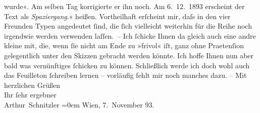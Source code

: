 \begin{ledgroupsized}[t]{13cm}
{{{                     wurde«. Am selben Tag korrigierte er ihn noch. Am
                     6. 12. 1893 erscheint der Text als \emph{Spaziergang}.}}}\label{K_L00280_1h}« heißen. Vortheilhaft erſcheint mir, daſs
               in den vier Freunden \label{LL001-2v}Typen\label{LL001-2h} angedeutet
               ſind, die ſich vielleicht {\pb}weiterhin für die Reihe
               noch irgendwie werden verwenden laſſen. –\pend
           \pstart
           Ich ſchicke Ihnen da gleich auch eine andre kleine \label{K_L00280_2v}\label{K_L00280_2h} mit, die, wenn ſie
               nicht am Ende zu »frivol« iſt, ganz ohne Praetenſion gelegentlich unter den Skizzen
               gebracht werden könnte.\pend
           \pstart
           Ich hoffe Ihnen nun aber bald was vernünftiges ſchicken {\pb}zu können. \label{LL001-1v}Schließlich werde ich doch wohl auch das Feuilleton
                  ſchreiben lernen – vorläufig fehlt mir noch manches dazu\label{LL001-1h}.\pend
           \pstart
           – Mit herzlichen Grüßen{\\[\baselineskip]}Ihr ſehr ergebner{\\[\baselineskip]}\spacefill\mbox{Arthur Schnitzler}\pend
           \leftskip=0em{}\pstart
           Wien, 7. November
                     93.\pend
           
         
         \endnumbering{}\end{ledgroupsized}  \newcommand{\dateiname}{L00280}\newcommand{\titel}{Arthur Schnitzler an Hermann Bahr, 7. 11. 1893}\newcommand{\editorInnen}{ Kurt Ifkovits,  Martin Anton Müller}
      